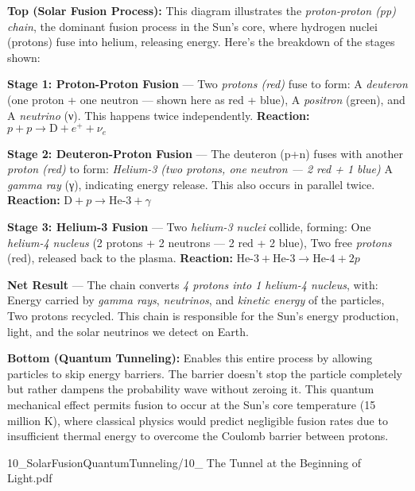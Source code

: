 \begin{SideNotePage}{
  \textbf{Top (Solar Fusion Process):} This diagram illustrates the \emph{proton-proton (pp) chain}, the dominant fusion process in the Sun's core, where hydrogen nuclei (protons) fuse into helium, releasing energy. Here's the breakdown of the stages shown: \par
  \textbf{Stage 1: Proton-Proton Fusion} — Two \emph{protons (red)} fuse to form: A \emph{deuteron} (one proton + one neutron — shown here as red + blue), A \emph{positron} (green), and A \emph{neutrino} ({\greekfont ν}). This happens twice independently. \textbf{Reaction:} $p + p \rightarrow \text{D} + e^+ + \nu_e$ \par
  \textbf{Stage 2: Deuteron-Proton Fusion} — The deuteron (p+n) fuses with another \emph{proton (red)} to form: \emph{Helium-3 (two protons, one neutron — 2 red + 1 blue)} A \emph{gamma ray} ({\greekfont γ}), indicating energy release. This also occurs in parallel twice. \textbf{Reaction:} $\text{D} + p \rightarrow \text{He-3} + \gamma$ \par
  \textbf{Stage 3: Helium-3 Fusion} — Two \emph{helium-3 nuclei} collide, forming: One \emph{helium-4 nucleus} (2 protons + 2 neutrons — 2 red + 2 blue), Two free \emph{protons} (red), released back to the plasma. \textbf{Reaction:} $\text{He-3} + \text{He-3} \rightarrow \text{He-4} + 2p$ \par
  \textbf{Net Result} — The chain converts \emph{4 protons into 1 helium-4 nucleus}, with: Energy carried by \emph{gamma rays}, \emph{neutrinos}, and \emph{kinetic energy} of the particles, Two protons recycled. This chain is responsible for the Sun's energy production, light, and the solar neutrinos we detect on Earth. \par
  \textbf{Bottom (Quantum Tunneling):} Enables this entire process by allowing particles to skip energy barriers. The barrier doesn't stop the particle completely but rather dampens the probability wave without zeroing it. This quantum mechanical effect permits fusion to occur at the Sun's core temperature (15 million K), where classical physics would predict negligible fusion rates due to insufficient thermal energy to overcome the Coulomb barrier between protons.
}{10_SolarFusionQuantumTunneling/10_ The Tunnel at the Beginning of Light.pdf}
\end{SideNotePage}